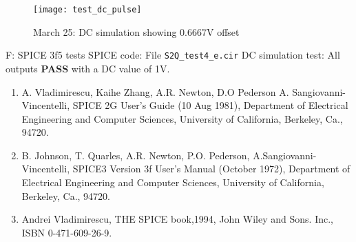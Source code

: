 \begin{figure}
  \centering
  \texttt{[image: test\_dc\_pulse]}
  \caption{March 25: DC simulation showing 0.6667V offset}
  \label{fig:S2Qtest4_7}
\end{figure} 

\begin{flushleft}
F: SPICE 3f5 tests
SPICE code: File \verb|S2Q_test4_e.cir|
\linebreak 
DC simulation test: All outputs \textbf{PASS }with a DC value of 1V.
\end{flushleft}

\begin{enumerate}
 \item A. Vladimirescu, Kaihe Zhang, A.R. Newton, D.O Pederson A. Sangiovanni-Vincentelli, SPICE 2G User's Guide (10 Aug 1981), Department of Electrical Engineering and Computer Sciences, University of California, Berkeley, Ca., 94720.
\item B. Johnson, T. Quarles, A.R. Newton, P.O. Pederson, A.Sangiovanni-Vincentelli, SPICE3 Version 3f User's Manual (October 1972),  Department of Electrical Engineering and Computer Sciences, University of California, Berkeley, Ca., 94720.
\item Andrei Vladimirescu, THE SPICE book,1994, John Wiley and Sons. Inc., ISBN 0-471-609-26-9.
\end{enumerate}



